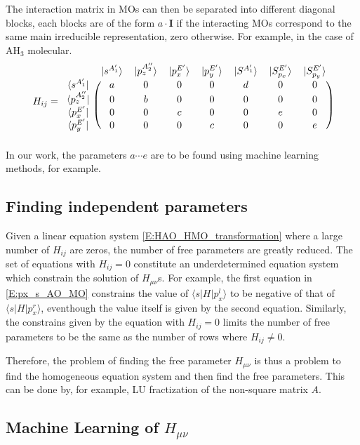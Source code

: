 \documentclass{article}
\begin{document}
The interaction matrix in MOs can then be separated into different diagonal blocks, each blocks are of the form $a\cdot \mathbf{I}$ if 
the interacting MOs correspond to the same main irreducible representation, zero otherwise.
For example, in the case of AH$_3$ molecular.
\begin{equation}
    H_{ij} = \begin{blockarray}{cccccccc}
        & |s^{A_1'}\rangle & |p_z^{A_2''}\rangle & |p_x^{E'}\rangle & |p_y^{E'}\rangle 
        & |S^{A_1'}\rangle & |S^{E'}_{p_x}\rangle & |S^{E'}_{p_y}\rangle \\
        \begin{block}{c(ccccccc)}
        \langle s^{A_1'}    |  & a & 0 & 0 & 0 & d & 0 & 0 \\
        \langle p_z^{A_2''} |  & 0 & b & 0 & 0 & 0 & 0 & 0 \\
        \langle p_x^{E'}    |  & 0 & 0 & c & 0 & 0 & e & 0 \\
        \langle p_y^{E'}    |  & 0 & 0 & 0 & c & 0 & 0 & e \\
        \end{block}
        \end{blockarray}
\end{equation}
In our work, the parameters $a \cdots e$ are to be found using machine learning methods, for example. 

\subsection{Finding independent parameters}
Given a linear equation system \eqref{E:HAO_HMO_transformation} where a large number of $H_{ij}$ are zeros,
the number of free parameters are greatly reduced. The set of equations with $H_{ij} = 0$ constitute an 
underdetermined equation system which constrain the solution of $H_{\mu\nu}$s. For example, the first 
equation in \eqref{E:px_s_AO_MO} constrains the value of $\langle s | H | p_x^l \rangle$ to be negative of 
that of $\langle s | H | p_x^r \rangle$, eventhough the value itself is given by the second equation. 
Similarly, the constrains given by the equation with $H_{ij} = 0$ limits the number of free parameters 
to be the same as the number of rows where $H_{ij} \neq 0$. 

Therefore, the problem of finding the free parameter $H_{\mu\nu}$ is thus a problem to find the homogeneous 
equation system and then find the free parameters. This can be done by, for example, LU fractization of the 
non-square matrix $A$.

\subsection{Machine Learning of $H_{\mu\nu}$}
 
\end{document}
